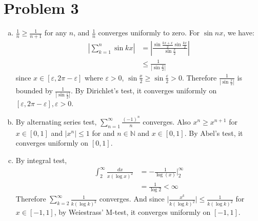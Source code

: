 \documentclass{report}
\def\ve{\varepsilon}
\begin{document}
    \section*{Problem 3}
    \begin{enumerate}[(a)]
        \item 
        $\frac{1}{n} \ge \frac{1}{n+1}$ for any $n$, and 
        $\frac{1}{n}$ converges uniformly to zero. For $\sin nx$, we have:
        \begin{align*}
            \left| \sum_{k=1}^n \sin kx \right| &= \left| \frac{\sin\frac{kx+x}{2}
            \sin\frac{kx}{2}}{\sin\frac{x}{2}} \right| \\
            &\le\frac{1}{\left|\sin\frac{x}{2} \right|}
        \end{align*}
        since $x \in [\ve, 2\pi - \ve]$ where $\ve > 0$, $\sin \frac{x}{2} \ge \sin
        \frac{\ve}{2} > 0$. Therefore $\frac{1}{\left|\sin\frac{x}{2} \right|}$ is bounded
        by $\frac{1}{\left|\sin\frac{\ve}{2} \right|}$. By Dirichlet's test, it converges
        uniformly on $[\ve, 2\pi - \ve], \ve > 0$.
        \item 
        By alternating series test, $\sum_{n=1}^\infty \frac{{(-1)}^n}{n}$ converges.
        Also $x^n \ge x^{n+1}$ for $x \in [0,1]$ and $|x^n| \le 1$ for and $n\in\mathbb{N}
        $ and $x \in [0, 1]$. By Abel's test, it converges uniformly on $[0, 1]$.
        \item 
        By integral test, 
        \begin{align*}
            \int_2^\infty \frac{dx}{x {(\log x)}^2} &= -\frac{1}{\log(x)} \bigg|_2^\infty \\
            &= \frac{1}{\log 2} < \infty
        \end{align*}
        Therefore $\sum_{k=2}^\infty \frac{1}{k{(\log k)}^2}$ converges.
        And since $\bigg|\frac{x^k}{k{(\log k)}^2}\bigg| \le \frac{1}{k{(\log k)}^2}$ for 
        $x \in [-1, 1]$, by Weiestrass' M-test, it converges uniformly on $[-1, 1]$.
    \end{enumerate}
    
\end{document}
